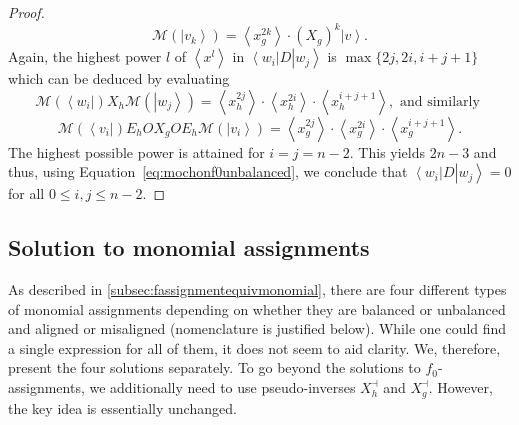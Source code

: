 \documentclass{article}
\begin{document}
\begin{proof}
  \begin{displaymath}
    \mathcal{M}(\left|v_{k}\right\rangle )=\left\langle x_{g}^{2k}\right\rangle \cdot(X_{g})^{k}\left|v\right\rangle .
  \end{displaymath}
  Again, the highest power $l$ of $\left\langle x^{l}\right\rangle $
  in $\left\langle w_{i}\right|D\left|w_{j}\right\rangle $
  is $\max\{2j,2i,i+j+1\}$ which can be deduced by evaluating
  \begin{displaymath}
    \mathcal{M}(\left\langle w_{i}\right|)X_{h}\mathcal{M}(\left|w_{j}\right\rangle )=\left\langle x_{h}^{2j}\right\rangle \cdot\left\langle x_{h}^{2i}\right\rangle \cdot\left\langle x_{h}^{i+j+1}\right\rangle, \text{ and similarly }
  \end{displaymath}
  \begin{displaymath}
    \mathcal{M}(\left\langle v_{i}\right|)E_{h}OX_{g}OE_{h}\mathcal{M}(\left|v_{i}\right\rangle )=\left\langle x_{g}^{2j}\right\rangle \cdot\left\langle x_{g}^{2i}\right\rangle \cdot\left\langle x_{g}^{i+j+1}\right\rangle .
  \end{displaymath}
  The highest possible power is attained for $i=j=n-2$. This yields
  $2n-3$ and thus, using Equation~\eqref{eq:mochonf0unbalanced}, we conclude that
  $\left\langle w_{i}\right|D\left|w_{j}\right\rangle =0$ for
  all $0\le i,j\le n-2$.
\end{proof}

\subsection{Solution to monomial assignments}
\label{subsec:solutionmonomialalgebraic}
As described in \cref{subsec:fassignmentequivmonomial}, there are four different types of monomial assignments depending on whether they are balanced or unbalanced and aligned or misaligned (nomenclature is justified below).
While one could find a single expression
for all of them, it does not seem to aid clarity. We, therefore, present the four solutions separately.
%
To go beyond the solutions to $f_0$-assignments, we additionally need to use pseudo-inverses $X_{h}^{\dashv}$ and $X_{g}^{\dashv}$. However, the key idea is essentially unchanged.
%
%
%
\end{document}
